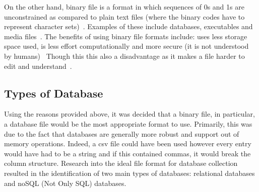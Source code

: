 On the other hand, binary file is a format in which sequences of 0s and 1s are
unconstrained as compared to plain text files (where the binary codes have to
represent character sets)~\cite{Spacey2017}. Examples of these
include databases, executables and media files~\cite{Spacey2017}. The benefits of using binary file formats
include: uses less storage space used, is less effort computationally and more
secure (it is not understood by humans)~\cite{Azad} Though this this also a
disadvantage as it makes a file harder to edit and understand~\cite{Azad}.

\subsection{Types of Database}\label{subsec:Types_of_DB}
Using the reasons provided above, it was decided that a binary file, in
particular, a database file would be
the most appropriate format to use. Primarily, this was due to the fact that
databases are generally more robust and support out of memory operations.
Indeed, a csv file could have been used however every entry would have had to be
a string and if this contained commas, it would break the column structure. Research into the ideal
file format for database collection resulted in the identification of two main
types of databases: relational databases and noSQL (Not Only SQL) databases.

